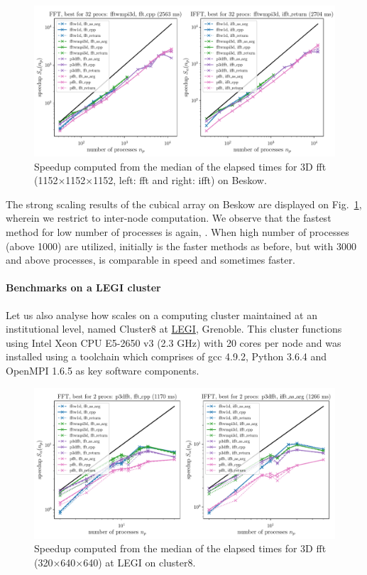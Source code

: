 \begin{figure}[htp!]
\centering
\includegraphics[width=\linewidth]{tmp/fig_beskow_1152x1152x1152}
\caption{Speedup computed from the median of the elapsed times for 3D fft
(1152$\times$1152$\times$1152, left: fft and right: ifft) on Beskow.}
\label{fig:beskow1152x1152x1152}
\end{figure}

The strong scaling results of the cubical array on Beskow are displayed on
Fig.~\ref{fig:beskow1152x1152x1152}, wherein we restrict to inter-node
computation.  We observe that the fastest method for low number of processes is
again, . When high number of processes (above 1000)
are utilized, initially  is the faster methods as before,
but with 3000 and above processes,  is comparable in speed and
sometimes faster.

\paragraph{Benchmarks on a LEGI cluster}

Let us also analyse how  scales on a computing cluster
maintained at an institutional level, named Cluster8 at \href{%
http://www.legi.grenoble-inp.fr}{LEGI}, Grenoble. This cluster functions using
Intel Xeon CPU E5-2650 v3 (2.3 GHz) with 20 cores per node and 
was installed using a toolchain which comprises of gcc 4.9.2, Python 3.6.4 and
OpenMPI 1.6.5 as key software components.

\begin{figure}[htp!]
\centering
\includegraphics[width=\linewidth]{tmp/fig_legi_cluster8_320x640x640}
\caption{Speedup computed from the median of the elapsed times for 3D fft
(320$\times$640$\times$640) at LEGI on cluster8.}
\label{fig:cluster8:320x640x640}
\end{figure}

